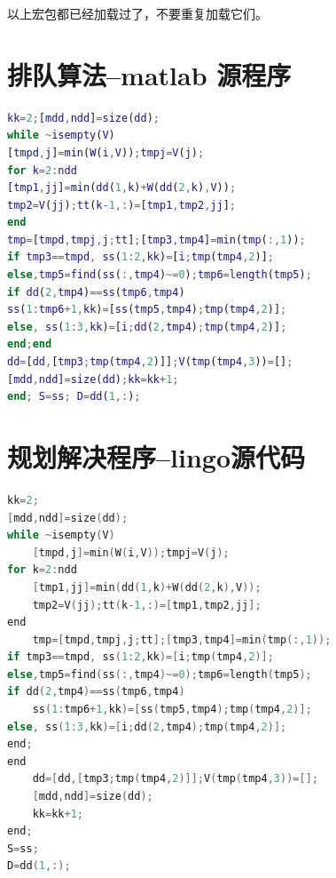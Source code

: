 \begin{appendices}
以上宏包都已经加载过了，不要重复加载它们。

\section{排队算法--matlab 源程序}

\begin{lstlisting}[language=matlab]
kk=2;[mdd,ndd]=size(dd);
while ~isempty(V)
[tmpd,j]=min(W(i,V));tmpj=V(j);
for k=2:ndd
[tmp1,jj]=min(dd(1,k)+W(dd(2,k),V));
tmp2=V(jj);tt(k-1,:)=[tmp1,tmp2,jj];
end
tmp=[tmpd,tmpj,j;tt];[tmp3,tmp4]=min(tmp(:,1));
if tmp3==tmpd, ss(1:2,kk)=[i;tmp(tmp4,2)];
else,tmp5=find(ss(:,tmp4)~=0);tmp6=length(tmp5);
if dd(2,tmp4)==ss(tmp6,tmp4)
ss(1:tmp6+1,kk)=[ss(tmp5,tmp4);tmp(tmp4,2)];
else, ss(1:3,kk)=[i;dd(2,tmp4);tmp(tmp4,2)];
end;end
dd=[dd,[tmp3;tmp(tmp4,2)]];V(tmp(tmp4,3))=[];
[mdd,ndd]=size(dd);kk=kk+1;
end; S=ss; D=dd(1,:);
\end{lstlisting}

\section{规划解决程序--lingo源代码}

\begin{lstlisting}[language=c]
kk=2;
[mdd,ndd]=size(dd);
while ~isempty(V)
    [tmpd,j]=min(W(i,V));tmpj=V(j);
for k=2:ndd
    [tmp1,jj]=min(dd(1,k)+W(dd(2,k),V));
    tmp2=V(jj);tt(k-1,:)=[tmp1,tmp2,jj];
end
    tmp=[tmpd,tmpj,j;tt];[tmp3,tmp4]=min(tmp(:,1));
if tmp3==tmpd, ss(1:2,kk)=[i;tmp(tmp4,2)];
else,tmp5=find(ss(:,tmp4)~=0);tmp6=length(tmp5);
if dd(2,tmp4)==ss(tmp6,tmp4)
    ss(1:tmp6+1,kk)=[ss(tmp5,tmp4);tmp(tmp4,2)];
else, ss(1:3,kk)=[i;dd(2,tmp4);tmp(tmp4,2)];
end;
end
    dd=[dd,[tmp3;tmp(tmp4,2)]];V(tmp(tmp4,3))=[];
    [mdd,ndd]=size(dd);
    kk=kk+1;
end;
S=ss;
D=dd(1,:);
\end{lstlisting}
\end{appendices}
